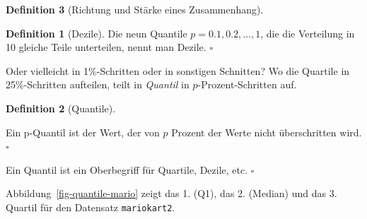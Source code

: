 \documentclass[
  a4paper,
  DIV=11]{scrreprt}
\theoremstyle{definition}
\theoremstyle{definition}
\theoremstyle{definition}
\newtheorem{definition}{Definition}[chapter]
\theoremstyle{remark}
\begin{document}
\begin{definition}[Richtung und Stärke eines
Zusammenhang]
\begin{definition}[Dezile]
Die neun Quantile \(p= 0.1, 0.2, \ldots, 1\), die die Verteilung in 10
gleiche Teile unterteilen, nennt man Dezile. \(\square\)

\end{definition}

Oder vielleicht in 1\%-Schritten oder in sonstigen Schnitten? Wo die
Quartile in 25\%-Schritten aufteilen, teilt in \emph{Quantil} in
\(p\)-Prozent-Schritten auf.

\begin{definition}[Quantile]\protect\hypertarget{def-quantile}{}\label{def-quantile}

Ein p-Quantil ist der Wert, der von \(p\) Prozent der Werte nicht
überschritten wird.\(\square\)

\end{definition}

\begin{tcolorbox}[enhanced jigsaw, leftrule=.75mm, opacitybacktitle=0.6, colback=white, colframe=quarto-callout-note-color-frame, coltitle=black, colbacktitle=quarto-callout-note-color!10!white, opacityback=0, left=2mm, breakable, titlerule=0mm, toptitle=1mm, bottomtitle=1mm, rightrule=.15mm, title=\textcolor{quarto-callout-note-color}{\faInfo}\hspace{0.5em}{Hinweis}, arc=.35mm, bottomrule=.15mm, toprule=.15mm]

Ein Quantil ist ein Oberbegriff für Quartile, Dezile, etc. \(\square\)

\end{tcolorbox}

Abbildung~\ref{fig-quantile-mario} zeigt das 1. (Q1), das 2. (Median)
und das 3. Quartil für den Datensatz \texttt{mariokart2}.

\begin{figure}

\end{figure}
\end{definition}
\end{document}
